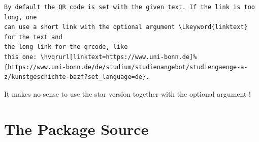 \documentclass[twoside=on,usegeometry]{scrartcl}
\begin{document}
\begin{lstlisting}
By default the QR code is set with the given text. If the link is too long, one
can use a short link with the optional argument \Lkeyword{linktext} for the text and 
the long link for the qrcode, like
this one: \hvqrurl[linktext=https://www.uni-bonn.de]%
{https://www.uni-bonn.de/de/studium/studienangebot/studiengaenge-a-z/kunstgeschichte-bazf?set_language=de}.
\end{lstlisting}

It makes no sense to use the star version  together with the optional argument
!



\printindex


\section{The Package Source}

\end{document}
